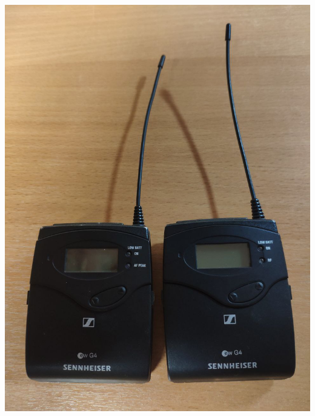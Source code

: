 \begin{enumerate}
\begin{enumerate}
                \begin{minipage}[c]{0.4\textwidth}
                  \includegraphics[width=\textwidth]{Images/PortableCamera/micro/step10.1-1-micro-diference-front.jpg}
                \end{minipage}
                \hfill
                \begin{minipage}[c]{0.4\textwidth}

\end{minipage}
\end{enumerate}
\end{enumerate}
